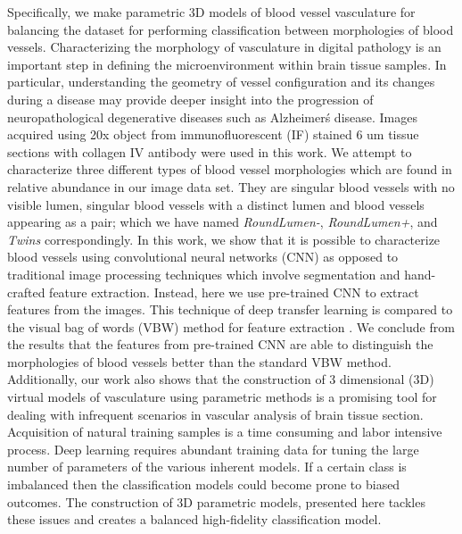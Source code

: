 Specifically, we make parametric 3D models of blood vessel vasculature for balancing the dataset for performing classification between morphologies of blood vessels.
Characterizing the morphology of vasculature in digital pathology is an important step in defining the microenvironment within brain tissue samples. In particular, understanding the geometry of vessel configuration and its changes during a disease may provide deeper insight into the progression of neuropathological degenerative diseases such as Alzheimer\'s disease. Images acquired using 20x object from immunofluorescent (IF) stained 6 um tissue sections with collagen IV antibody were used in this work.  We attempt to characterize three different types of blood vessel morphologies which are found in relative abundance in our image data set. They are singular blood vessels with no visible lumen, singular blood vessels with a distinct lumen and blood vessels appearing as a pair; which we have named \textit{RoundLumen-}, \textit{RoundLumen+}, and \textit{Twins} correspondingly.
In this work, we show that it is possible to characterize blood vessels using convolutional neural networks (CNN) as opposed to traditional image processing techniques which involve segmentation and hand-crafted feature extraction. Instead, here we use pre-trained CNN to extract features from the images. This technique of deep transfer learning is compared to the visual bag of words (VBW) method for feature extraction \cite{yang2007evaluating}. We conclude from the results that the features from pre-trained CNN are able to distinguish the morphologies of blood vessels better than the standard VBW method. 
Additionally, our work also shows that the construction of 3 dimensional (3D) virtual models of vasculature using parametric methods is a promising tool for dealing with infrequent scenarios in vascular analysis of brain tissue section. Acquisition of natural training samples is a time consuming and labor intensive process. Deep learning requires abundant training data for tuning the large number of parameters of the various inherent models. If a certain class is imbalanced then the classification models could become prone to biased outcomes. The construction of 3D parametric models, presented here tackles these issues and creates a balanced high-fidelity classification model. 
